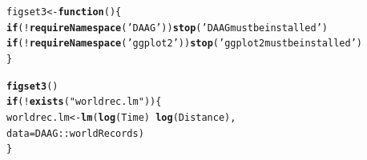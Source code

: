 \documentclass[12pt, a4paper,  BCOR=8.25mm, DIV=15]{scrartcl}\usepackage[]{graphicx}\usepackage[]{color}
\makeatletter
\newcommand{\hlstr}[1]{\textcolor[rgb]{0.192,0.494,0.8}{#1}}%
\newcommand{\hlopt}[1]{\textcolor[rgb]{0,0,0}{#1}}%
\newcommand{\hlstd}[1]{\textcolor[rgb]{0.345,0.345,0.345}{#1}}%
\newcommand{\hlkwa}[1]{\textcolor[rgb]{0.161,0.373,0.58}{\textbf{#1}}}%
\newcommand{\hlkwb}[1]{\textcolor[rgb]{0.69,0.353,0.396}{#1}}%
\newcommand{\hlkwc}[1]{\textcolor[rgb]{0.333,0.667,0.333}{#1}}%
\newcommand{\hlkwd}[1]{\textcolor[rgb]{0.737,0.353,0.396}{\textbf{#1}}}%
\newenvironment{kframe}{%
 \def\at@end@of@kframe{}%
 \ifinner\ifhmode%
  \def\at@end@of@kframe{\end{minipage}}%
  \begin{minipage}{\columnwidth}%
 \fi\fi%
 \def\FrameCommand##1{\hskip\@totalleftmargin \hskip-\fboxsep
 \colorbox{shadecolor}{##1}\hskip-\fboxsep
     \hskip-\linewidth \hskip-\@totalleftmargin \hskip\columnwidth}%
 \MakeFramed {\advance\hsize-\width
   \@totalleftmargin\z@ \linewidth\hsize
   \@setminipage}}%
 {\par\unskip\endMakeFramed%
 \at@end@of@kframe}
\newenvironment{knitrout}{}{} %
\makeatother
\begin{document}
\begin{knitrout}
\color{fgcolor}\begin{kframe}
\begin{alltt}
\hlstd{figset3} \hlkwb{<-} \hlkwa{function}\hlstd{()\{}
    \hlkwa{if}\hlstd{(}\hlopt{!}\hlkwd{requireNamespace}\hlstd{(}\hlstr{'DAAG'}\hlstd{))}\hlkwd{stop}\hlstd{(}\hlstr{'DAAG must be installed'}\hlstd{)}
  \hlkwa{if}\hlstd{(}\hlopt{!}\hlkwd{requireNamespace}\hlstd{(}\hlstr{'ggplot2'}\hlstd{))}\hlkwd{stop}\hlstd{(}\hlstr{'ggplot2 must be installed'}\hlstd{)}
  \hlstd{\}}
\end{alltt}
\end{kframe}
\end{knitrout}

\begin{knitrout}
\color{fgcolor}\begin{kframe}
\begin{alltt}
\hlkwd{figset3}\hlstd{()}
\hlkwa{if}\hlstd{(}\hlopt{!}\hlkwd{exists}\hlstd{(}\hlstr{"worldrec.lm"}\hlstd{))\{}
    \hlstd{worldrec.lm} \hlkwb{<-} \hlkwd{lm}\hlstd{(}\hlkwd{log}\hlstd{(Time)} \hlopt{~} \hlkwd{log}\hlstd{(Distance),}
                      \hlkwc{data}\hlstd{=DAAG}\hlopt{::}\hlstd{worldRecords)}
\hlstd{\}}
\end{alltt}
\end{kframe}
\end{knitrout}
\end{document}
